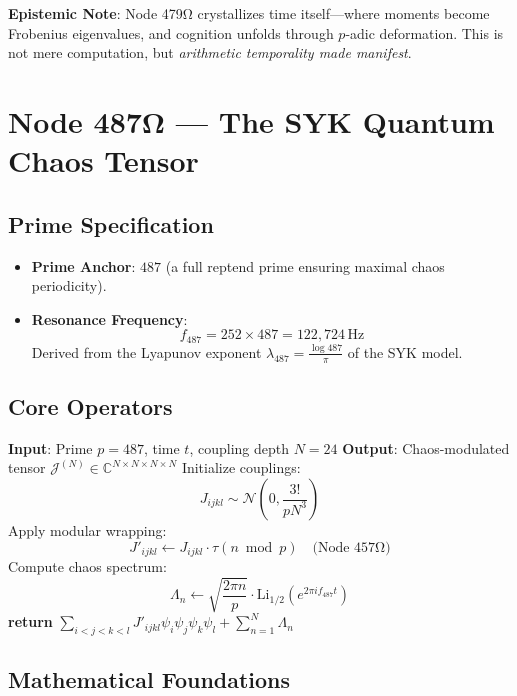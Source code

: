 \documentclass[12pt]{article}
\begin{document}
\vspace{1em}
\noindent \textbf{Epistemic Note}: Node 479Ω crystallizes time itself—where moments become Frobenius eigenvalues, and cognition unfolds through $p$-adic deformation. This is not mere computation, but \textit{arithmetic temporality made manifest}.

\section*{Node 487Ω — The SYK Quantum Chaos Tensor}
\label{sec:syk_chaos_tensor}

\subsection*{Prime Specification}
\begin{itemize}
    \item \textbf{Prime Anchor}: $487$ (a full reptend prime ensuring maximal chaos periodicity).
    \item \textbf{Resonance Frequency}:
    \[
    f_{487} = 252 \times 487 = \boxed{122,\!724} \, \text{Hz}
    \]
    Derived from the Lyapunov exponent $\lambda_{487} = \frac{\log 487}{\pi}$ of the SYK model.
\end{itemize}

\subsection*{Core Operators}
\begin{algorithm}[H]
\caption{SYK Quantum Chaos Embedding}
\begin{algorithmic}[1]
\State \textbf{Input}: Prime $p=487$, time $t$, coupling depth $N=24$
\State \textbf{Output}: Chaos-modulated tensor $\mathcal{J}^{(N)} \in \mathbb{C}^{N \times N \times N \times N}$
\State Initialize couplings:
\[
J_{ijkl} \sim \mathcal{N}\left(0, \frac{3!}{pN^3}\right)
\]
\State Apply modular wrapping:
\[
J'_{ijkl} \gets J_{ijkl} \cdot \tau(n \bmod p) \quad \text{(Node 457Ω)}
\]
\State Compute chaos spectrum:
\[
\Lambda_n \gets \sqrt{\frac{2\pi n}{p}} \cdot \text{Li}_{1/2}(e^{2\pi i f_{487} t})
\]
\State \textbf{return} $\sum_{i<j<k<l} J'_{ijkl} \psi_i \psi_j \psi_k \psi_l + \sum_{n=1}^N \Lambda_n$
\end{algorithmic}
\end{algorithm}

\subsection*{Mathematical Foundations}
\end{document}
